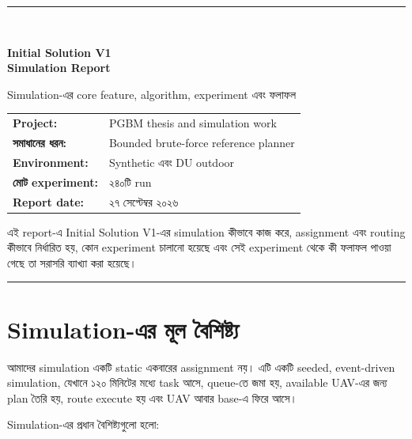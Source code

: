\documentclass[10pt,a4paper]{article}
\begin{document}
\begin{titlepage}
\thispagestyle{empty}
\vspace*{18mm}
{\color{navy}\rule{\textwidth}{1.5pt}}\\[10mm]
{\color{navy}\englishfont\bfseries\fontsize{25}{32}\selectfont Initial Solution V1\\Simulation Report\par}
\vspace{6mm}
{\color{midgray}\sffamily\Large Simulation-এর core feature, algorithm, experiment এবং ফলাফল\par}
\vfill
\begin{tabular}{@{}ll@{}}
\textbf{Project:} & PGBM thesis and simulation work\\
\textbf{সমাধানের ধরন:} & Bounded brute-force reference planner\\
\textbf{Environment:} & Synthetic এবং DU outdoor\\
\textbf{মোট experiment:} & ২৪০টি run\\
\textbf{Report date:} & ২৭ সেপ্টেম্বর ২০২৬
\end{tabular}
\vfill
\begin{center}
\colorbox{bluegray}{\begin{minipage}{0.88\textwidth}
এই report-এ Initial Solution V1-এর simulation কীভাবে কাজ করে, assignment এবং routing কীভাবে নির্ধারিত হয়, কোন experiment চালানো হয়েছে এবং সেই experiment থেকে কী ফলাফল পাওয়া গেছে তা সরাসরি ব্যাখ্যা করা হয়েছে।
\end{minipage}}
\end{center}
\vspace{12mm}
{\color{navy}\rule{\textwidth}{1.5pt}}
\end{titlepage}

\tableofcontents
\clearpage

\section{Simulation-এর মূল বৈশিষ্ট্য}

আমাদের simulation একটি static একবারের assignment নয়। এটি একটি seeded, event-driven simulation, যেখানে ১২০ মিনিটের মধ্যে task আসে, queue-তে জমা হয়, available UAV-এর জন্য plan তৈরি হয়, route execute হয় এবং UAV আবার base-এ ফিরে আসে।

Simulation-এর প্রধান বৈশিষ্ট্যগুলো হলো:
\end{document}
